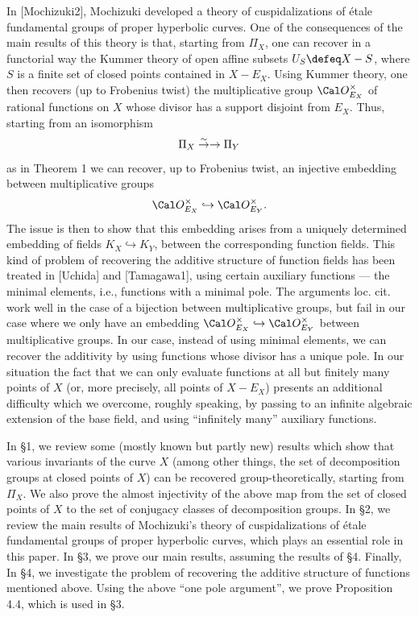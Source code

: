In [Mochizuki2], Mochizuki developed 
a theory of cuspidalizations of \'etale fundamental 
groups of proper hyperbolic curves. One of the consequences 
of the main results of this theory 
is that, starting from $\Pi_X$, one can recover in a functorial way
the Kummer theory of open affine subsets 
$U_S\defeq X-S$, where $S$ is a finite set of closed 
points contained in  $X-E_X$. Using Kummer 
theory, one then recovers (up to Frobenius twist) the multiplicative group 
$\Cal O_{E_X}^{\times}$ of rational functions on $X$ whose 
divisor has a support disjoint from $E_X$. Thus, starting from an isomorphism
$$\Pi_X\overset \sim \to \rightarrow \Pi_Y$$ 
as in Theorem 1 we can recover, up to Frobenius twist, an injective embedding between 
multiplicative groups
$$\Cal O_{E_X}^{\times} \hookrightarrow \Cal O_{E_Y}^{\times}.$$ 
The issue is then to show that this embedding arises from 
a uniquely determined embedding of fields $K_X\hookrightarrow K_Y$, between the 
corresponding function fields. 
This kind of problem of recovering the additive structure of function 
fields has been treated in [Uchida] and [Tamagawa1], using certain 
auxiliary functions --- the 
minimal elements, i.e., functions with a minimal pole. The arguments loc. cit.
work well in the case of a bijection between multiplicative groups, but fail in our case where 
we only have an embedding $\Cal O_{E_X}^{\times} \hookrightarrow \Cal O_{E_Y}^{\times}$ between 
multiplicative groups. In our case, 
instead of using minimal elements, we can recover the additivity by 
using functions whose divisor has a unique pole. 
In our situation the fact that we can only evaluate functions at all 
but finitely many points of $X$ (or, more precisely, 
all points of $X-E_X$) presents an additional 
difficulty which we overcome, roughly speaking, by passing to an infinite algebraic extension of 
the base field, and using ``infinitely many'' auxiliary functions.

In \S 1, we review some 
(mostly known but partly new) 
results which show that various invariants of the curve 
$X$ (among other things, the set of decomposition groups at closed points 
of $X$) can be recovered group-theoretically, 
starting from $\Pi_X$. We also prove the almost injectivity of the above map 
{}from the set of closed points of $X$ to the set of conjugacy 
classes of decomposition groups. 
In \S 2, we review the main results of Mochizuki's theory of
cuspidalizations of \'etale fundamental groups of proper hyperbolic curves, 
which plays an essential role in this paper. 
In \S 3, we prove our main results, assuming the 
results of \S 4. Finally, 
In \S 4, we investigate the problem of recovering the 
additive structure of functions mentioned above. Using the above 
``one pole argument'', we prove 
Proposition 4.4, which is used in \S 3.



